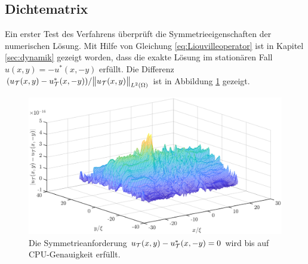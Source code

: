\subsection{Dichtematrix}
Ein erster Test des Verfahrens überprüft die Symmetrieeigenschaften der numerischen Lösung. Mit Hilfe von Gleichung \eqref{eq:Liouvilleoperator} ist in Kapitel \ref{sec:dynamik} gezeigt worden, dass die exakte Lösung im stationären Fall $u(x,y) = -u^*(x,-y)$ erfüllt. Die Differenz $(u_{\mathcal{T}}(x,y)-u_{\mathcal{T}}^*(x,-y))/\norm{u_{\mathcal{T}}(x,y)}_{L^2(\Omega)}$ ist in Abbildung \ref{fig:parity} gezeigt.
\begin{figure}
  \centering
  \includegraphics[width=1.0\textwidth]{plots/parity_abs.eps}
  \caption{Die Symmetrieanforderung $u_{\mathcal{T}}(x,y)-u_{\mathcal{T}}^*(x,-y) = 0$ wird bis auf CPU-Genauigkeit erfüllt.}
  \label{fig:parity}
\end{figure}

